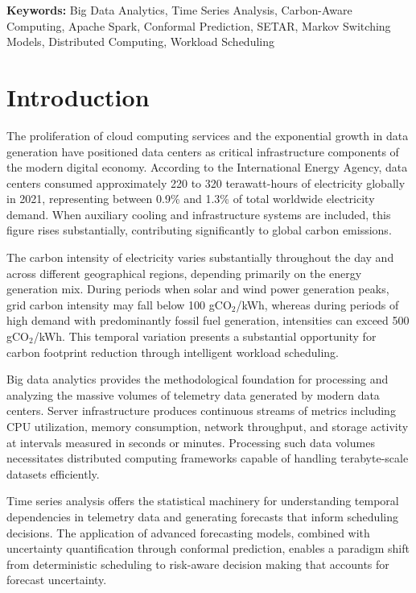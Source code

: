 \documentclass[12pt]{report}
\begin{document}
\vspace{0.5cm}
\noindent \textbf{Keywords:} Big Data Analytics, Time Series Analysis, Carbon-Aware Computing, Apache Spark, Conformal Prediction, SETAR, Markov Switching Models, Distributed Computing, Workload Scheduling


	
	\newpage
	\baselineskip1cm
	\setcounter{page}{1}
	\chapter{Introduction}

The proliferation of cloud computing services and the exponential growth in data generation have positioned data centers as critical infrastructure components of the modern digital economy. According to the International Energy Agency, data centers consumed approximately 220 to 320 terawatt-hours of electricity globally in 2021, representing between 0.9\% and 1.3\% of total worldwide electricity demand. When auxiliary cooling and infrastructure systems are included, this figure rises substantially, contributing significantly to global carbon emissions.

The carbon intensity of electricity varies substantially throughout the day and across different geographical regions, depending primarily on the energy generation mix. During periods when solar and wind power generation peaks, grid carbon intensity may fall below 100 gCO$_2$/kWh, whereas during periods of high demand with predominantly fossil fuel generation, intensities can exceed 500 gCO$_2$/kWh. This temporal variation presents a substantial opportunity for carbon footprint reduction through intelligent workload scheduling.

Big data analytics provides the methodological foundation for processing and analyzing the massive volumes of telemetry data generated by modern data centers. Server infrastructure produces continuous streams of metrics including CPU utilization, memory consumption, network throughput, and storage activity at intervals measured in seconds or minutes. Processing such data volumes necessitates distributed computing frameworks capable of handling terabyte-scale datasets efficiently.

Time series analysis offers the statistical machinery for understanding temporal dependencies in telemetry data and generating forecasts that inform scheduling decisions. The application of advanced forecasting models, combined with uncertainty quantification through conformal prediction, enables a paradigm shift from deterministic scheduling to risk-aware decision making that accounts for forecast uncertainty.
\end{document}
